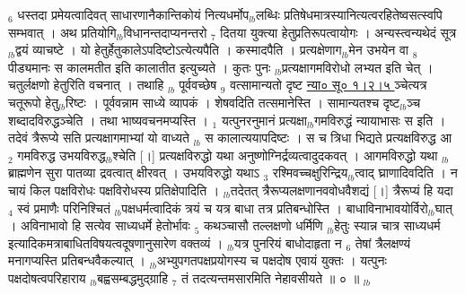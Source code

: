 \documentclass[article,12pt,a4paper]{memoir}%
\newcounter{parCount}
\begin{document}
{\tiny $_{6}$} धस्तदा प्रमेयत्वादिवत् साधारणानैकान्तिकोयं नित्यधर्मोप{\tiny $_{lb}$}लब्धिः प्रतिषेधमात्रस्यानित्यत्वरहितेष्वसत्स्वपि सम्भवात् । अथ प्रतियोगि{\tiny $_{lb}$}विधानन्तदाप्यनन्तरो {\tiny $_{7}$} दितया युक्त्या हेतुप्रतिरूपत्वायोगः । अन्यस्त्वन्यथेदं सूत्र{\tiny $_{lb}$}द्वयं व्याचष्टे । यो हेतुर्हेतुकालेऽपदिष्टोऽत्येत्यपैति । कस्मादपैति । प्रत्यक्षेणाग{\tiny $_{lb}$}मेन उभयेन वा {\tiny $_{8}$} पीड्यमानः स कालमतीत इति कालातीत इत्युच्यते । कुतः पुनः {\tiny $_{lb}$}प्रत्यक्षागमविरोधो लभ्यत इति चेत् । चतुर्लक्षणो हेतुरिति वचनात् । तथाहि {\tiny $_{lb}$} पूर्ववच्छेष {\tiny $_{9}$} \leavevmode{} वत्सामान्यतो दृष्ट \href{http://sarit.indology.info/?cref=ns\%C5\%AB.1.2.5}{न्या० सू० १।२।५ } ञ्चेत्यत्र चतूरूपो हेतु{\tiny $_{lb}$}रिष्टः । पूर्ववन्नाम साध्ये व्यापकं । शेषवदिति तत्समानेस्ति । सामान्यतश्च दृष्ट{\tiny $_{lb}$}ञ्च शब्दादविरुद्धञ्चेति । तथा भाष्यवचनमप्यस्ति । {\tiny $_{1}$} यत्पुनरनुमानं प्रत्यक्षा{\tiny $_{lb}$}गमविरुद्धं न्यायाभासः स इति । तदेवं त्रैरूप्ये सति प्रत्यक्षागमाभ्यां यो वाध्यते {\tiny $_{lb}$} \leavevmode{} स कालात्ययापदिष्टः । स च त्रिधा भिद्यते प्रत्यक्षविरुद्ध आ {\tiny $_{2}$} गमविरुद्ध उभयविरुद्ध{\tiny $_{lb}$}श्चेति [।] प्रत्यक्षविरुद्धो यथा अनुष्णोग्निर्द्रव्यत्वादुदकवत् । आगमविरुद्धो यथा {\tiny $_{lb}$}ब्राह्मणेन सुरा पातव्या द्रवत्वात् क्षीरवत् । उभयविरुद्धो यथाऽ {\tiny $_{3}$} रश्मिवच्चक्षुरिन्द्रिय{\tiny $_{lb}$}त्वाद् घ्राणादिवदिति । न चायं किल पक्षविरोधः पक्षविरोधस्य प्रतिक्षेपादिति । {\tiny $_{lb}$}तदेतत् त्रैरूप्यलक्षणानववोधवैशद्यं [।] त्रैरूप्यं हि यदा {\tiny $_{4}$} स्वं प्रमाणैः परिनिश्चितं {\tiny $_{lb}$}पक्षधर्मत्वादिकं त्रयं च यत्र बाधा तत्र प्रतिबन्धोस्ति । बाधाविनाभावयोर्विरो{\tiny $_{lb}$}घात् । अविनाभावो हि सत्येव साध्यधर्मे हेतोर्भावः {\tiny $_{5}$} कथञ्चासौ तल्लक्षणो धर्मिणि {\tiny $_{lb}$}हेतुः स्यान्न चात्र साध्यधर्म इत्यादिकमत्राबाधितविषयत्वदूषणानुसारेण वक्तव्यं । {\tiny $_{lb}$}यत्र पुनरियं बाधोदाहृता न {\tiny $_{6}$} तेषां त्रैलक्षण्यं मनागप्यस्ति प्रतिबन्धवैकल्यात् । {\tiny $_{lb}$}अभ्युपगतपक्षप्रयोगस्य च पक्षदोष एवायं युक्तः । यत्पुनः पक्षदोषत्वपरिहाराय {\tiny $_{lb}$}बह्वसम्बद्धमुद्ग्राहि {\tiny $_{7}$} तं तदत्यन्तमसारमिति नेहावसीयते ॥ ० ॥
	{}
	\pend%
      {\tiny $_{lb}$}
\end{document}
